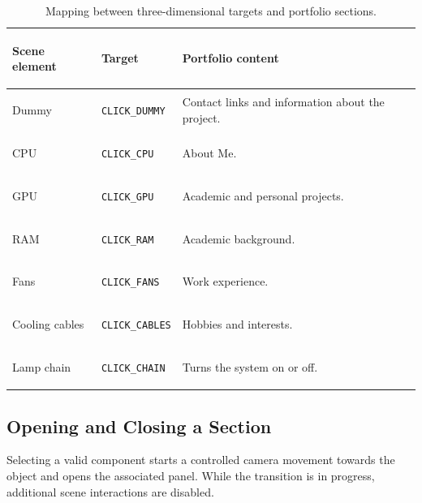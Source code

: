 \documentclass{report}
\begin{document}
\begin{table}[ht]
    \centering
    \small
    \setlength{\tabcolsep}{6pt}
    \renewcommand{\arraystretch}{1.2}

    \begin{tabularx}{\textwidth}{
        @{}
        >{\bfseries\raggedright\arraybackslash}p{}
        >{\raggedright\arraybackslash}p{}
        >{\raggedright\arraybackslash}X
        @{}
    }
        \toprule
        Scene element & Target & Portfolio content \\
        \midrule

        Dummy
        &
        \texttt{CLICK\_DUMMY}
        &
        Contact links and information about the project.
        \\

        CPU
        &
        \texttt{CLICK\_CPU}
        &
        About Me.
        \\

        GPU
        &
        \texttt{CLICK\_GPU}
        &
        Academic and personal projects.
        \\

        RAM
        &
        \texttt{CLICK\_RAM}
        &
        Academic background.
        \\

        Fans
        &
        \texttt{CLICK\_FANS}
        &
        Work experience.
        \\

        Cooling cables
        &
        \texttt{CLICK\_CABLES}
        &
        Hobbies and interests.
        \\

        Lamp chain
        &
        \texttt{CLICK\_CHAIN}
        &
        Turns the system on or off.
        \\

        \bottomrule
    \end{tabularx}

    \caption{Mapping between three-dimensional targets and portfolio sections.}
    \label{tab:portfolio-interaction-map}
\end{table}

\subsection{Opening and Closing a Section}

Selecting a valid component starts a controlled camera movement towards
the object and opens the associated panel. While the transition is in
progress, additional scene interactions are disabled.
\end{document}
